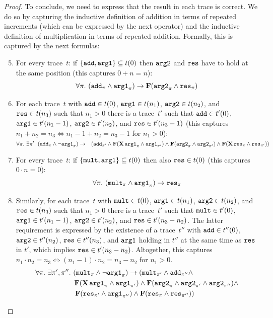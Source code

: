 \documentclass[dvipsnames,10pt,a4paper]{amsart}
\theoremstyle{definition}
\theoremstyle{remark}
\newcommand{\set}[1]{\{#1\}}
\newcommand{\F}{\mathop{\mathbf{F}\vphantom{a}}\nolimits}
\newcommand{\X}{\mathop{\mathbf{X}\vphantom{a}}\nolimits}
\newcommand\argl{\textup{\texttt{arg1}}}
\newcommand\argr{\textup{\texttt{arg2}}}
\newcommand\res{\textup{\texttt{res}}}
\newcommand\add{\textup{\texttt{add}}}
\newcommand\mult{\textup{\texttt{mult}}}
\begin{document}
\begin{proof}
To conclude, we need to express that the result in each trace is correct. We do so by capturing the inductive definition of addition in terms of repeated increments (which can be expressed by the next operator) and the inductive definition of multiplication in terms of repeated addition.
Formally, this is captured by the next formulas:	
	\begin{enumerate}
	  \setcounter{enumi}{4}
	\item\label{itemcorrfirst} For every trace~$t$: if $\set{\add,\argl} \subseteq t(0)$ then $\argr$ and $\res$ have to hold at the same position (this captures $0 + n = n$):
	\[
	\forall \pi.\ (\add_\pi\wedge \argl_\pi ) \rightarrow \F(\argr_\pi \wedge \res_\pi)
	\]
	\item For each trace~$t$ with $\add\in t(0)$, $\argl \in t(n_1)$,
    $\argr \in t(n_2)$, and $\res \in t(n_3)$ such that $n_1 > 0$ there is a trace~$t'$ such that $\add\in t'(0)$, $\argl \in t'(n_1-1)$,
    $\argr \in t'(n_2)$, and $\res \in t'(n_3-1)$ (this captures $n_1 + n_2 = n_3 \Leftrightarrow n_1-1 + n_2 = n_3-1$ for $n_1 > 0$):
    \\[.5em]$\displaystyle
    \forall \pi.\ \exists\pi'.\ (\add_\pi \wedge \neg \argl_\pi) \rightarrow\\ \phantom{x}\hfill \left(\add_{\pi'} \wedge  \F( \X\argl_{\pi} \wedge \argl_{\pi'} ) \wedge \F(\argr_\pi \wedge \argr_{\pi'}) \wedge \F(\X\res_{\pi} \wedge \res_{\pi'}) \right)$ \\[-.5em]
    \item For every trace~$t$: if $\set{\mult,\argl} \subseteq t(0)$ then also $\res \in t(0)$ (this captures $0 \cdot n = 0$):
	\[
	\forall \pi.\ (\mult_\pi\wedge \argl_\pi ) \rightarrow  \res_\pi
	\]
	\item\label{itemcorrlast} Similarly, for each trace~$t$ with $\mult \in t(0)$, $\argl \in t(n_1)$,
    $\argr \in t(n_2)$, and $\res \in t(n_3)$ such that $n_1 > 0$ there is a trace~$t'$ such that $\mult \in t'(0)$, $\argl \in t'(n_1-1)$,
    $\argr \in t'(n_2)$, and $\res \in t'(n_3-n_2)$.
   The latter requirement is expressed by the existence of a trace~$t''$ with $\add\in t''(0)$, $\argr \in t''(n_2)$, $\res \in t''(n_3)$, and $\argl$ holding in $t''$ at the same time as $\res$ in $t'$, which implies $\res \in t'(n_3-n_2)$. Altogether, this captures $n_1 \cdot n_2 = n_3 \Leftrightarrow (n_1-1) \cdot n_2 = n_3-n_2$ for $n_1 > 0$.
    \begin{align*}
    \forall \pi.\ \exists\pi',\pi''.\ &(\mult_\pi \wedge  \neg \argl_\pi) \rightarrow   \left(\mult_{\pi'} \wedge \add_{\pi''} \wedge\right.  \\ 
&    
    \F(\X\argl_{\pi} \wedge \argl_{\pi'} ) \wedge 
    \F(\argr_\pi \wedge \argr_{\pi'} \wedge \argr_{\pi''}) \wedge \\ 
&  \left.    \F(\res_{\pi'} \wedge \argl_{\pi''}) \wedge 
  \F(\res_{\pi} \wedge \res_{\pi''}
    )\right)
    \end{align*}
\end{enumerate}


\end{proof}
\end{document}
